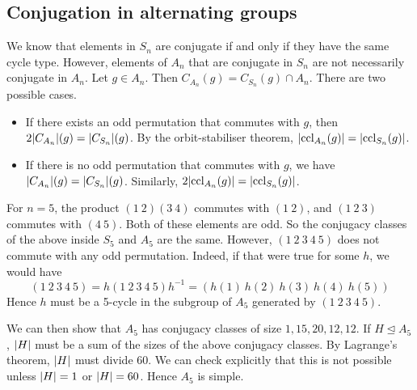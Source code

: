 \subsection{Conjugation in alternating groups}
We know that elements in \( S_n \) are conjugate if and only if they have the same cycle type.
However, elements of \( A_n \) that are conjugate in \( S_n \) are not necessarily conjugate in \( A_n \).
Let \( g \in A_n \).
Then \( C_{A_n}(g) = C_{S_n}(g) \cap A_n \).
There are two possible cases.
\begin{itemize}
	\item If there exists an odd permutation that commutes with \( g \), then \( 2\abs{C_{A_n}}(g) = \abs{C_{S_n}}(g) \).
	      By the orbit-stabiliser theorem, \( \abs{\operatorname{ccl}_{A_n}(g)} = \abs{\operatorname{ccl}_{S_n}(g)} \).
	\item If there is no odd permutation that commutes with \( g \), we have \( \abs{C_{A_n}}(g) = \abs{C_{S_n}}(g) \).
	      Similarly, \( 2\abs{\operatorname{ccl}_{A_n}(g)} = \abs{\operatorname{ccl}_{S_n}(g)} \).
\end{itemize}
\begin{example}
	For \( n = 5 \), the product \( (1\ 2)(3\ 4) \) commutes with \( (1\ 2) \), and \( (1\ 2\ 3) \) commutes with \( (4\ 5) \).
	Both of these elements are odd.
	So the conjugacy classes of the above inside \( S_5 \) and \( A_5 \) are the same.
	However, \( (1\ 2\ 3\ 4\ 5) \) does not commute with any odd permutation.
	Indeed, if that were true for some \( h \), we would have
	\[
		(1\ 2\ 3\ 4\ 5) = h (1\ 2\ 3\ 4\ 5) h^{-1} = (h(1)\ h(2)\ h(3)\ h(4)\ h(5))
	\]
	Hence \( h \) must be a 5-cycle in the subgroup of \( A_5 \) generated by \( (1\ 2\ 3\ 4\ 5) \).

	We can then show that \( A_5 \) has conjugacy classes of size \( 1, 15, 20, 12, 12 \).
	If \( H \trianglelefteq A_5 \), \( \abs{H} \) must be a sum of the sizes of the above conjugacy classes.
	By Lagrange's theorem, \( \abs{H} \) must divide 60.
	We can check explicitly that this is not possible unless \( \abs{H} = 1 \) or \( \abs{H} = 60 \).
	Hence \( A_5 \) is simple.
\end{example}

